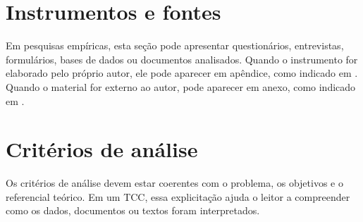 \section{Instrumentos e fontes}

Em pesquisas empíricas, esta seção pode apresentar questionários, entrevistas, formulários, bases de dados ou documentos analisados. Quando o instrumento for elaborado pelo próprio autor, ele pode aparecer em apêndice, como indicado em . Quando o material for externo ao autor, pode aparecer em anexo, como indicado em .

\section{Critérios de análise}

Os critérios de análise devem estar coerentes com o problema, os objetivos e o referencial teórico. Em um TCC, essa explicitação ajuda o leitor a compreender como os dados, documentos ou textos foram interpretados.

